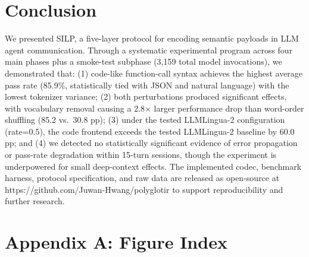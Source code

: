 \documentclass{article}
\begin{document}
\section{Conclusion}\label{conclusion}



We presented SILP, a five-layer protocol for encoding semantic payloads in LLM agent communication. Through a systematic experimental program across four main phases plus a smoke-test subphase (3,159 total model invocations), we demonstrated that: (1) code-like function-call syntax achieves the highest average pass rate (85.9\%, statistically tied with JSON and natural language) with the lowest tokenizer variance; (2) both perturbations produced significant effects, with vocabulary removal causing a 2.8$\times$ larger performance drop than word-order shuffling (85.2 vs.~30.8 pp); (3) under the tested LLMLingua-2 configuration (rate=0.5), the code frontend exceeds the tested LLMLingua-2 baseline by 60.0 pp; and (4) we detected no statistically significant evidence of error propagation or pass-rate degradation within 15-turn sessions, though the experiment is underpowered for small deep-context effects. The implemented codec, benchmark harness, protocol specification, and raw data are released as open-source at https://github.com/Juwan-Hwang/polyglotir to support reproducibility and further research.



\appendix\section{Appendix A: Figure Index}\label{appendix-a-figure-index}
\end{document}
